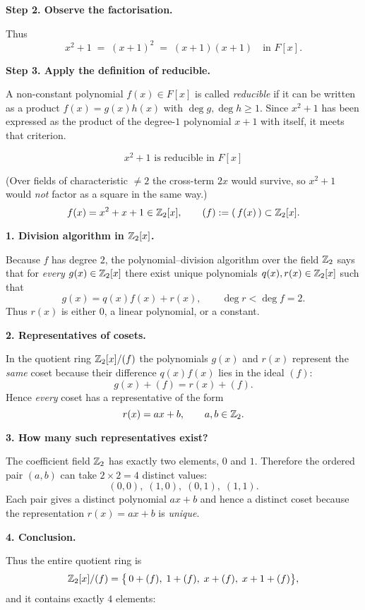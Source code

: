 \documentclass[12pt]{article}
\theoremstyle{definition} %
\theoremstyle{plain} %
\begin{document}
\bigskip
\textbf{Step 2.  Observe the factorisation.}

Thus
\[
x^{2}+1 \;=\; (x+1)^{2}
           \;=\; (x+1)(x+1)
           \quad\text{in }F[x].
\]

\bigskip
\textbf{Step 3.  Apply the definition of reducible.}

A non-constant polynomial $f(x)\in F[x]$ is called
\emph{reducible} if it can be written as a product
$f(x)=g(x)h(x)$ with $\deg g,\deg h\ge1$.
Since $x^{2}+1$ has been expressed as the product of the
degree-$1$ polynomial $x+1$ with itself, it meets that criterion.

\[
\boxed{\;x^{2}+1\text{ is reducible in }F[x]\;}
\]

(Over fields of characteristic $\neq2$ the cross-term $2x$ would
survive, so $x^{2}+1$ would \emph{not} factor as a square in the same
way.)
\[
f(x)=x^{2}+x+1\in\Bbb Z_{2}[x], 
\qquad (f):=(\,f(x)\,)\subset\Bbb Z_{2}[x].
\]

\bigskip
\textbf{1.  Division algorithm in \(\Bbb Z_{2}[x]\).}

Because \(f\) has degree \(2\), the polynomial–division algorithm over the
field \(\Bbb Z_{2}\) says that for \emph{every} \(g(x)\in\Bbb Z_{2}[x]\)
there exist unique polynomials \(q(x),r(x)\in\Bbb Z_{2}[x]\) such that
\[
g(x)=q(x)f(x)+r(x),
\qquad
\deg r<\deg f=2.
\]
Thus \(r(x)\) is either \(0\), a linear polynomial, or a constant.

\bigskip
\textbf{2.  Representatives of cosets.}

In the quotient ring
\(\Bbb Z_{2}[x]/(f)\) the polynomials \(g(x)\) and \(r(x)\)
represent the \emph{same} coset because their difference \(q(x)f(x)\)
lies in the ideal \((f)\):
\[
g(x)+(f)=r(x)+(f).
\]
Hence \emph{every} coset has a representative of the form
\[
r(x)=ax+b,
\qquad a,b\in\Bbb Z_{2}.
\]

\bigskip
\textbf{3.  How many such representatives exist?}

The coefficient field \(\Bbb Z_{2}\) has exactly two elements,
\(0\) and \(1\).  
Therefore the ordered pair \((a,b)\) can take \(2\times2=4\) distinct
values:
\[
(0,0),\;(1,0),\;(0,1),\;(1,1).
\]
Each pair gives a distinct polynomial \(ax+b\) and hence a distinct coset
because the representation \(r(x)=ax+b\) is \emph{unique}.  

\bigskip
\textbf{4.  Conclusion.}

Thus the entire quotient ring is
\[
\Bbb Z_{2}[x]/(f)
=\bigl\{\,0+(f),\; 1+(f),\; x+(f),\; x+1+(f)\bigr\},
\]
and it contains exactly \(4\) elements:
\end{document}
